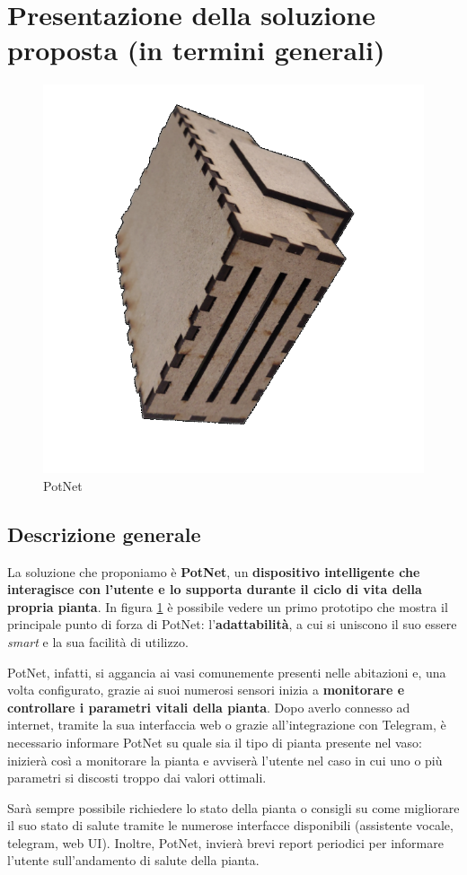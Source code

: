 \section{Presentazione della soluzione proposta (in termini generali)}

\begin{figure}
	\centering
	\vspace{-15mm}
	\includegraphics[width=.4\textwidth]{images/potnet.png}
	\vspace{-7mm}
	\caption{PotNet}
	\vspace{-5mm}
	\label{fig:potnet}
\end{figure}

\subsection{Descrizione generale}

La soluzione che proponiamo è \textbf{PotNet}, un \textbf{dispositivo intelligente che interagisce con l'utente e lo supporta durante il ciclo di vita della propria pianta}. In figura \ref{fig:potnet} è possibile vedere un primo prototipo che mostra il principale punto di forza di PotNet: l'\textbf{adattabilità}, a cui si uniscono il suo essere \textit{smart} e la sua facilità di utilizzo.

PotNet, infatti, si aggancia ai vasi comunemente presenti nelle abitazioni e, una volta configurato, grazie ai suoi numerosi sensori inizia a \textbf{monitorare e controllare i parametri vitali della pianta}.
Dopo averlo connesso ad internet, tramite la sua interfaccia web o grazie all'integrazione con Telegram, è necessario informare PotNet su quale sia il tipo di pianta presente nel vaso: inizierà così a monitorare la pianta e avviserà l'utente nel caso in cui uno o più parametri si discosti troppo dai valori ottimali.

Sarà sempre possibile richiedere lo stato della pianta o consigli su come migliorare il suo stato di salute tramite le numerose interfacce disponibili (assistente vocale, telegram, web UI). Inoltre, PotNet, invierà brevi report periodici per informare l'utente sull'andamento di salute della pianta.

